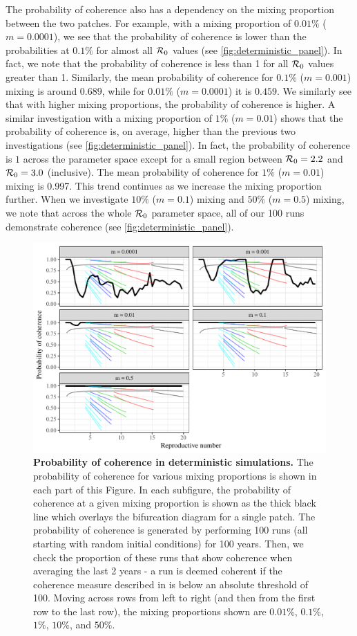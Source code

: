\documentclass[12pt]{article}
\newcommand{\R}{{\cal R}}
\begin{document}
The probability of coherence also has a dependency on the mixing proportion between the two patches. For example, with a mixing proportion of $0.01\%$ ($m = 0.0001$), we see that the probability of coherence is lower than the probabilities at $0.1\%$ for almost all $\R_0$ values (see \autoref{fig:deterministic_panel}). In fact, we note that the probability of coherence is less than 1 for all $\R_0$ values greater than 1. Similarly, the mean probability of coherence for $0.1\%$ ($m=0.001$) mixing is around $0.689$, while for $0.01\%$ ($m=0.0001$) it is $0.459$. We similarly see that with higher mixing proportions, the probability of coherence is higher. A similar investigation with a mixing proportion of $1\%$ ($m=0.01$) shows that the probability of coherence is, on average, higher than the previous two investigations (see \autoref{fig:deterministic_panel}). In fact, the probability of coherence is $1$ across the parameter space except for a small region between $\R_0=2.2$ and $\R_0=3.0$ (inclusive). The mean probability of coherence for $1\%$ ($m=0.01$) mixing is 0.997. This trend continues as we increase the mixing proportion further. When we investigate $10\%$ ($m=0.1$) mixing and $50\%$ ($m=0.5$) mixing, we note that across the whole $\R_0$ parameter space, all of our 100 runs demonstrate coherence (see \autoref{fig:deterministic_panel}).

\begin{figure}
\centering
\includegraphics[width=\textwidth]{supplementary/probabilitycoherence}
\caption{\textbf{Probability of coherence in deterministic simulations.} The probability of coherence for various mixing proportions is shown in each part of this Figure. In each subfigure, the probability of coherence at a given mixing proportion is shown as the thick black line which overlays the bifurcation diagram for a single patch. The probability of coherence is generated by performing 100 runs (all starting with random initial conditions) for 100 years. Then, we check the proportion of these runs that show coherence when averaging the last 2 years - a run is deemed coherent if the coherence measure described in  is below an absolute threshold of 100. Moving across rows from left to right (and then from the first row to the last row), the mixing proportions shown are $0.01\%$, $0.1\%$, $1\%$, $10\%$, and $50\%$.}
\label{fig:deterministic_panel}
\end{figure}
\end{document}

